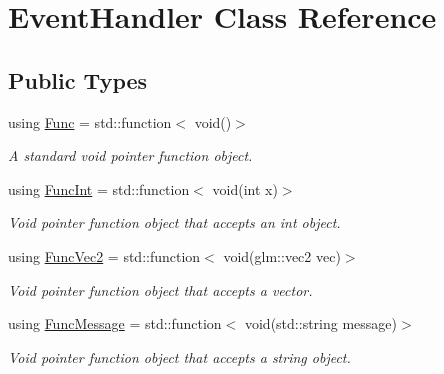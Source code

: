 \hypertarget{class_event_handler}{\section{Event\+Handler Class Reference}
\label{class_event_handler}
}
\subsection*{Public Types}
\begin{DoxyCompactItemize}
\item 
\hypertarget{class_event_handler_af1c003b45c76eb6eb0852801a997561b}{using \hyperlink{class_event_handler_af1c003b45c76eb6eb0852801a997561b}{Func} = std\+::function$<$ void()$>$}\label{class_event_handler_af1c003b45c76eb6eb0852801a997561b}

\begin{DoxyCompactList}\small\item\em A standard void pointer function object. \end{DoxyCompactList}\item 
\hypertarget{class_event_handler_afc053859d1bdb89bd10f01ff22c99fed}{using \hyperlink{class_event_handler_afc053859d1bdb89bd10f01ff22c99fed}{Func\+Int} = std\+::function$<$ void(int x)$>$}\label{class_event_handler_afc053859d1bdb89bd10f01ff22c99fed}

\begin{DoxyCompactList}\small\item\em Void pointer function object that accepts an int object. \end{DoxyCompactList}\item 
\hypertarget{class_event_handler_a814f37c7df5b2bf170d82904b3e525d6}{using \hyperlink{class_event_handler_a814f37c7df5b2bf170d82904b3e525d6}{Func\+Vec2} = std\+::function$<$ void(glm\+::vec2 vec)$>$}\label{class_event_handler_a814f37c7df5b2bf170d82904b3e525d6}

\begin{DoxyCompactList}\small\item\em Void pointer function object that accepts a vector. \end{DoxyCompactList}\item 
\hypertarget{class_event_handler_a21c76d0c722afe4925c87aa3544e2ce6}{using \hyperlink{class_event_handler_a21c76d0c722afe4925c87aa3544e2ce6}{Func\+Message} = std\+::function$<$ void(std\+::string message)$>$}\label{class_event_handler_a21c76d0c722afe4925c87aa3544e2ce6}

\begin{DoxyCompactList}\small\item\em Void pointer function object that accepts a string object. \end{DoxyCompactList}\end{DoxyCompactItemize}
